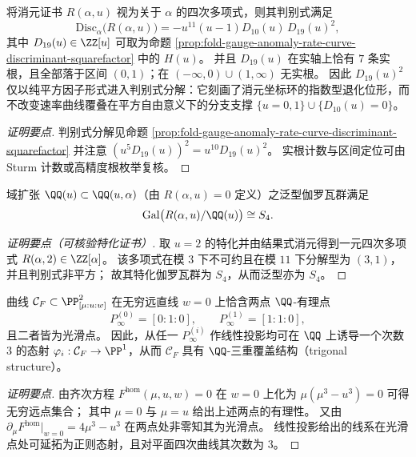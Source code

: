 \begin{conclusion}\label{con:fold-gauge-anomaly-rate-curve-discriminant-D19}
将消元证书 \(R(\alpha,u)\) 视为关于 \(\alpha\) 的四次多项式，则其判别式满足
\[
\mathrm{Disc}_{\alpha}\bigl(R(\alpha,u)\bigr)= -u^{11}(u-1)D_{10}(u)\,D_{19}(u)^2,
\]
其中 \(D_{19}(u)\in\ZZ[u]\) 可取为命题 \ref{prop:fold-gauge-anomaly-rate-curve-discriminant-squarefactor} 中的 \(H(u)\)。
并且 \(D_{19}(u)\) 在实轴上恰有 \(7\) 条实根，且全部落于区间 \((0,1)\)；在 \((-\infty,0)\cup(1,\infty)\) 无实根。
因此 \(D_{19}(u)^2\) 仅以纯平方因子形式进入判别式分解：它刻画了消元坐标环的指数型退化位形，而不改变速率曲线覆叠在平方自由意义下的分支支撑 \(\{u=0,1\}\cup\{D_{10}(u)=0\}\)。
\end{conclusion}
\begin{proof}[证明要点]
判别式分解见命题 \ref{prop:fold-gauge-anomaly-rate-curve-discriminant-squarefactor} 并注意 \((u^5D_{19}(u))^2=u^{10}D_{19}(u)^2\)。
实根计数与区间定位可由 Sturm 计数或高精度根枚举复核。
\end{proof}

\begin{conclusion}\label{con:fold-gauge-anomaly-rate-curve-generic-galois-s4}
域扩张 \(\QQ(u)\subset\QQ(u,\alpha)\)（由 \(R(\alpha,u)=0\) 定义）之泛型伽罗瓦群满足
\[
\mathrm{Gal}\bigl(R(\alpha,u)/\QQ(u)\bigr)\cong S_4.
\]
\end{conclusion}
\begin{proof}[证明要点（可核验特化证书）]
取 \(u=2\) 的特化并由结果式消元得到一元四次多项式 \(R(\alpha,2)\in\ZZ[\alpha]\)。
该多项式在模 \(3\) 下不可约且在模 \(11\) 下分解型为 \((3,1)\)，并且判别式非平方；
故其特化伽罗瓦群为 \(S_4\)，从而泛型亦为 \(S_4\)。
\end{proof}



\begin{conclusion}\label{con:fold-gauge-anomaly-trigonal-structure}
曲线 \(\mathcal C_F\subset\PP^2_{[\mu:u:w]}\) 在无穷远直线 \(w=0\) 上恰含两点 \(\QQ\)-有理点
\[
P_{\infty}^{(0)}=[0:1:0],\qquad P_{\infty}^{(1)}=[1:1:0],
\]
且二者皆为光滑点。
因此，从任一 \(P_{\infty}^{(i)}\) 作线性投影均可在 \(\QQ\) 上诱导一个次数 \(3\) 的态射
\(
\varphi_i:\mathcal C_F\to\PP^1
\)，从而 \(\mathcal C_F\) 具有 \(\QQ\)-三重覆盖结构（trigonal structure）。
\end{conclusion}
\begin{proof}[证明要点]
由齐次方程 \(F^{\mathrm{hom}}(\mu,u,w)=0\) 在 \(w=0\) 上化为 \(\mu(\mu^3-u^3)=0\) 可得无穷远点集合；
其中 \(\mu=0\) 与 \(\mu=u\) 给出上述两点的有理性。
又由 \(\partial_{\mu}F^{\mathrm{hom}}|_{w=0}=4\mu^3-u^3\) 在两点处非零知其为光滑点。
线性投影给出的线系在光滑点处可延拓为正则态射，且对平面四次曲线其次数为 \(3\)。
\end{proof}

